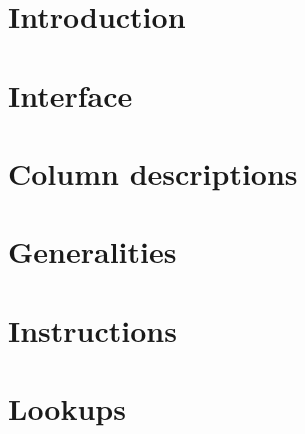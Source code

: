 
\section{Introduction}                    \label{rlp utils: introduction}                          
\section{Interface}			     \label{rlp utils: interface}                             
\section{Column descriptions}                \label{rlp utils: column descriptions}                   
\section{Generalities}                       \label{rlp utils: generalities}                          
\section{Instructions}                       \label{rlp utils: instructions}                          
\section{Lookups}                            \label{rlp utils: lookups}                               

